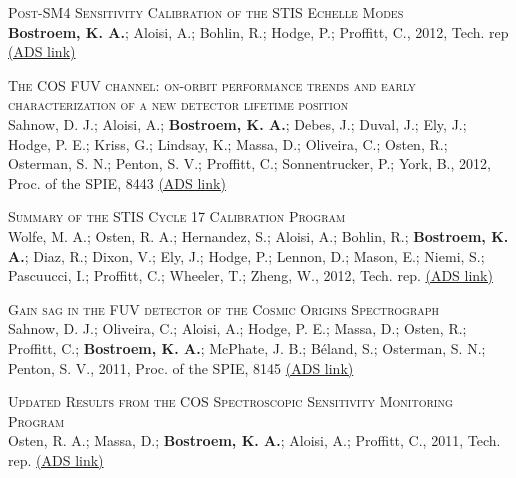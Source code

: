 \begin{revnumerate}[24]
\item{\textsc{Post-SM4 Sensitivity Calibration of the STIS Echelle Modes}\\
{\bf Bostroem, K. A.}; Aloisi, A.; Bohlin, R.; Hodge, P.; Proffitt, C., 2012, Tech. rep 
\color{blue}\href{https://ui.adsabs.harvard.edu/abs/2012stis.rept....1B/abstract}{(ADS link)}\color{black}}\\%

\item{\textsc{The COS FUV channel: on-orbit performance trends and early characterization of a new detector lifetime position}\\
Sahnow, D. J.; Aloisi, A.; \textbf{Bostroem, K. A.}; Debes, J.; Duval, J.; Ely, J.; Hodge, P. E.; Kriss, G.; Lindsay, K.; Massa, D.; Oliveira, C.; Osten, R.; Osterman, S. N.; Penton, S. V.; Proffitt, C.; Sonnentrucker, P.; York, B., 2012, Proc. of the SPIE, 8443 
\color{blue}\href{https://ui.adsabs.harvard.edu/abs/2012SPIE.8443E..4CS/abstract}{(ADS link)}\color{black}}\\

\item{\textsc{Summary of the STIS Cycle 17 Calibration Program}\\
Wolfe, M. A.; Osten, R. A.; Hernandez, S.; Aloisi, A.; Bohlin, R.; \textbf{Bostroem, K. A.}; Diaz, R.; Dixon, V.; Ely, J.; Hodge, P.; Lennon, D.; Mason, E.; Niemi, S.; Pascuucci, I.; Proffitt, C.; Wheeler, T.; Zheng, W., 2012, Tech. rep. 
\color{blue}\href{https://ui.adsabs.harvard.edu/abs/2012stis.rept....3W/abstract}{(ADS link)}\color{black}}\\%

\item{\textsc{Gain sag in the FUV detector of the Cosmic Origins Spectrograph}\\
Sahnow, D. J.; Oliveira, C.; Aloisi, A.; Hodge, P. E.; Massa, D.; Osten, R.; Proffitt, C.; \textbf{Bostroem, K. A.}; McPhate, J. B.; B\'{e}land, S.; Osterman, S. N.; Penton, S. V., 2011,  Proc. of the SPIE, 8145 
\color{blue}\href{https://ui.adsabs.harvard.edu/abs/2011SPIE.8145E..0QS/abstract}{(ADS link)}\color{black}}\\ %

\item{\textsc{Updated Results from the COS Spectroscopic Sensitivity Monitoring Program}\\
Osten, R. A.; Massa, D.; \textbf{Bostroem, K. A.}; Aloisi, A.; Proffitt, C., 2011, Tech. rep. 
\color{blue}\href{https://ui.adsabs.harvard.edu/abs/2011cos..rept....2O/abstract}{(ADS link)}\color{black}}\\ %


\end{revnumerate}
